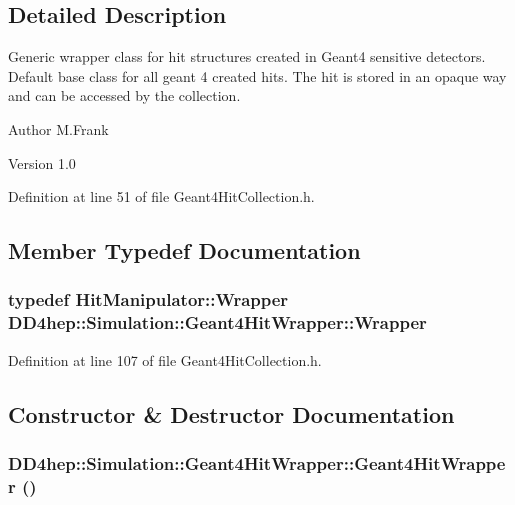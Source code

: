 \subsection{Detailed Description}
Generic wrapper class for hit structures created in Geant4 sensitive detectors. Default base class for all geant 4 created hits. The hit is stored in an opaque way and can be accessed by the collection.

\begin{DoxyAuthor}{Author}
M.Frank 
\end{DoxyAuthor}
\begin{DoxyVersion}{Version}
1.0 
\end{DoxyVersion}


Definition at line 51 of file Geant4HitCollection.h.

\subsection{Member Typedef Documentation}
\hypertarget{class_d_d4hep_1_1_simulation_1_1_geant4_hit_wrapper_a4779e35eba7d553e0f2d497c49a42ec6}{
\subsubsection[{Wrapper}]{\setlength{\rightskip}{0pt plus 5cm}typedef {\bf HitManipulator::Wrapper} {\bf DD4hep::Simulation::Geant4HitWrapper::Wrapper}}}
\label{class_d_d4hep_1_1_simulation_1_1_geant4_hit_wrapper_a4779e35eba7d553e0f2d497c49a42ec6}


Definition at line 107 of file Geant4HitCollection.h.

\subsection{Constructor \& Destructor Documentation}
\hypertarget{class_d_d4hep_1_1_simulation_1_1_geant4_hit_wrapper_a57ccfb5f6f606751279a9c3222532250}{
\subsubsection[{Geant4HitWrapper}]{\setlength{\rightskip}{0pt plus 5cm}DD4hep::Simulation::Geant4HitWrapper::Geant4HitWrapper ()}}
\label{class_d_d4hep_1_1_simulation_1_1_geant4_hit_wrapper_a57ccfb5f6f606751279a9c3222532250}


